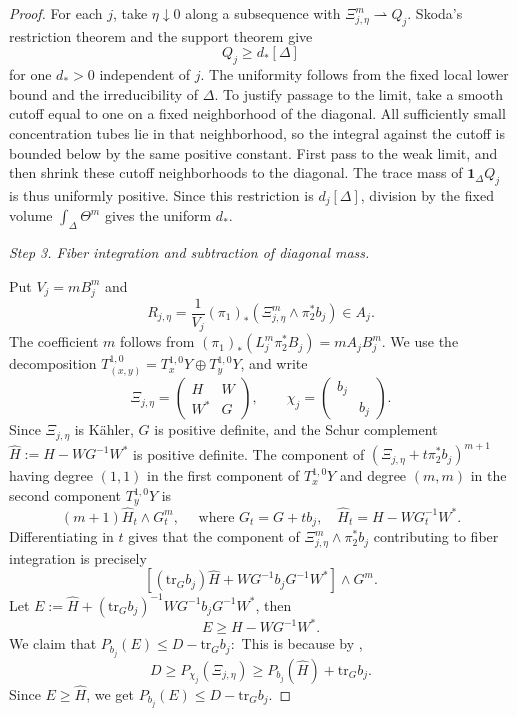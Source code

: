 \documentclass[reqno]{amsart}
\theoremstyle{remark}
\def\tr{\text{tr}}
\def\W{{\mathfrak W}}
\def\W{{\mathfrak W}}
\theoremstyle{plain}
\begin{document}
\begin{proof}
For each \(j\), take \(\eta\downarrow0\) along a subsequence with
\(\Xi_{j,\eta}^m\rightharpoonup Q_j\). Skoda's restriction theorem and the support theorem give
\begin{equation}\label{eq:diagonal-mass}
Q_j\ge d_*[\Delta]
\end{equation}
for one \(d_*>0\) independent of \(j\). The uniformity follows from the fixed local lower bound and the irreducibility of \(\Delta\). To justify passage to the limit, take a smooth cutoff equal to one on a fixed neighborhood of the diagonal. All sufficiently small concentration tubes lie in that neighborhood, so the integral against the cutoff is bounded below by the same positive constant. First pass to the weak limit, and then shrink these cutoff neighborhoods to the diagonal. The trace mass of \(\mathbf1_\Delta Q_j\) is thus uniformly positive. Since this restriction is \(d_j[\Delta]\), division by the fixed volume \(\int_\Delta\Theta^m\) gives the uniform \(d_*\). 

\emph{Step 3. Fiber integration and subtraction of diagonal mass.}

Put \(V_j=mB_j^m\) and
\[
R_{j,\eta}=\frac1{V_j}(\pi_1)_*
(\Xi_{j,\eta}^m\wedge\pi_2^*b_j)\in A_j.
\]
The coefficient \(m\) follows from
\((\pi_1)_*(L_j^m\pi_2^*B_j)=mA_jB_j^m\).
We use the decomposition $T^{1,0}_{(x,y)}=T^{1,0}_xY\oplus T_y^{1,0}Y$, and write \[
\Xi_{j,\eta}=\begin{pmatrix}
    H&W\\W^*&G
\end{pmatrix},\qquad \chi_j=\begin{pmatrix}
    b_j&\\&b_j
\end{pmatrix}.
\]
Since $\Xi_{j,\eta}$ is K\"ahler, $G$ is positive definite, and the Schur complement $\widehat{H}:=H-WG^{-1}W^*$ is positive definite. The component of $(\Xi_{j,\eta}+t\pi_2^*b_j)^{m+1}$ having degree $(1,1)$ in the first component of $T^{1,0}_xY$ and degree $(m,m)$ in the second component $T^{1,0}_yY$ is \[
(m+1)\widehat{H}_t\wedge G_t^m, \quad \text{ where }G_t=G+tb_j,\quad \widehat{H}_t=H-WG_t^{-1}W^*.
\]
Differentiating in $t$ gives that the component of $\Xi_{j,\eta}^m\wedge\pi_2^*b_j$ contributing to fiber integration is precisely \[
[(\tr_Gb_j)\widehat{H}+WG^{-1}b_jG^{-1}W^*]\wedge G^m.
\]
Let $E:=\widehat{H}+(\tr_Gb_j)^{-1}WG^{-1}b_jG^{-1}W^*$, then 
\[
E\ge H-WG^{-1}W^*.
\]We claim that $P_{b_j}(E)\le D-\tr_Gb_j:$
This is because by \cite[Lemma 3.5]{Chen21},  \[
D\ge P_{\chi_j}(\Xi_{j,\eta})\ge P_{b_j}(\widehat{H})+\tr_Gb_j.
\]
Since $E\geq \widehat{H}$, we get  $P_{b_j}(E)\leq D-\tr_Gb_j.$



\end{proof}
\end{document}
